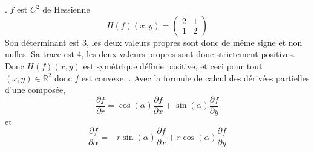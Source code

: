 \documentclass{report}
\begin{document}
\subsection{} \noindent{}\\ 
\\ 
\\
. $f$ est $C^2$ de Hessienne $$H(f)(x,y)=\begin{pmatrix}
2 & 1\\
1 & 2
\end{pmatrix}$$
Son déterminant est $3$, les deux valeurs propres sont donc de même signe et non nulles. Sa trace est $4$, les deux valeurs propres sont donc strictement positives. Donc $H(f)(x,y)$ est symétrique définie positive, et ceci pour tout $(x,y)\in \mathbb R^2$ donc $f$ est convexe.\newline
{}. Avec la formule de calcul des dérivées partielles d'une composée, $$\frac{\partial f}{\partial r} = \cos(\alpha)\frac{\partial f}{\partial x} + \sin(\alpha)\frac{\partial f}{\partial y}$$
et 
$$\frac{\partial f}{\partial \alpha} = -r\sin(\alpha)\frac{\partial f}{\partial x} + r\cos(\alpha)\frac{\partial f}{\partial y}$$
\end{document}
